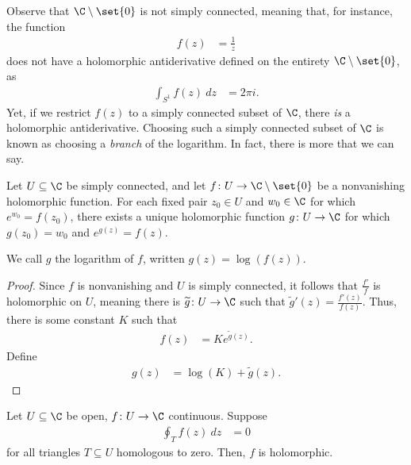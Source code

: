 \documentclass[10pt]{mypackage}
\begin{document}
Observe that $\C\setminus \set{0}$ is not simply connected, meaning that, for instance, the function
\begin{align*}
  f(z) &= \frac{1}{z}
\end{align*}
does not have a holomorphic antiderivative defined on the entirety $\C\setminus \set{0}$, as
\begin{align*}
  \int_{S^1}^{} f(z)\:dz &= 2\pi i.
\end{align*}
Yet, if we restrict $f(z)$ to a simply connected subset of $\C$, there \textit{is} a holomorphic antiderivative. Choosing such a simply connected subset of $\C$ is known as choosing a \textit{branch} of the logarithm. In fact, there is more that we can say.
\begin{corollary}
  Let $U\subseteq \C$ be simply connected, and let $f\colon U\rightarrow \C\setminus \set{0}$ be a nonvanishing holomorphic function. For each fixed pair $z_0\in U$ and $w_0\in \C$ for which $e^{w_0} = f\left( z_0 \right)$, there exists a unique holomorphic function $g\colon U\rightarrow \C$ for which $g\left(z_0\right) = w_0$ and $e^{g(z)} = f(z)$.\newline

  We call $g$ the logarithm of $f$, written $g(z) = \log\left( f(z) \right)$.
\end{corollary}
\begin{proof}
  Since $f$ is nonvanishing and $U$ is simply connected, it follows that $\frac{f'}{f}$ is holomorphic on $U$, meaning there is $ \widetilde{g}\colon U\rightarrow \C $ such that $\widetilde{g}'(z) = \frac{f'(z)}{f(z)}$. Thus, there is some constant $K$ such that
  \begin{align*}
    f(z) &= Ke^{\widetilde{g}(z)}.
  \end{align*}
  Define
  \begin{align*}
    g(z) &= \log(K) + \widetilde{g}(z).
  \end{align*}
\end{proof}
\begin{theorem}
  Let $U\subseteq \C$ be open, $f\colon U\rightarrow \C$ continuous. Suppose
  \begin{align*}
    \oint_{T}^{} f(z)\:dz &= 0
  \end{align*}
  for all triangles $T\subseteq U$ homologous to zero. Then, $f$ is holomorphic.
\end{theorem}
\end{document}
